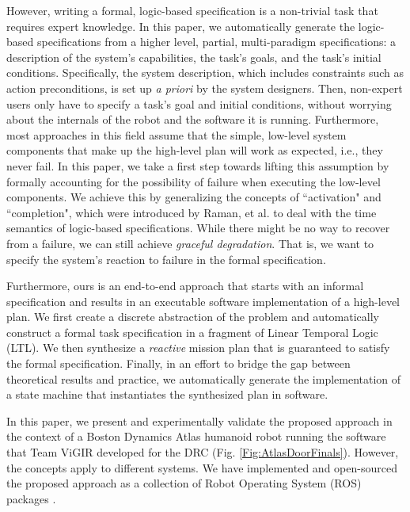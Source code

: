 However, writing a formal, logic-based specification is a non-trivial task that requires expert knowledge.
In this paper, we automatically generate the logic-based specifications from a higher level, partial, multi-paradigm specifications: a description of the system's capabilities, the task's goals, and the task's initial conditions.
Specifically, the system description, which includes constraints such as action preconditions, is set up \emph{a priori} by the system designers.
Then, non-expert users only have to specify a task's goal and initial conditions, without worrying about the internals of the robot and the software it is running.
Furthermore, most approaches in this field assume that the simple, low-level system components that make up the high-level plan will work as expected, i.e., they never fail.
In this paper, we take a first step towards lifting this assumption by formally accounting for the possibility of failure when executing the low-level components.
We achieve this by generalizing the concepts of ``activation" and ``completion", which were introduced by Raman, et al. \cite{Vasu2013ICRA} to deal with the time semantics of logic-based specifications.
While there might be no way to recover from a failure, we can still achieve \emph{graceful degradation}.
That is, we want to specify the system's reaction to failure in the formal specification.

Furthermore, ours is an end-to-end approach that starts with an informal specification and results in an executable software implementation of a high-level plan.
We first create a discrete abstraction of the problem and automatically construct a formal task specification in a fragment of Linear Temporal Logic (\textsc{LTL}).
We then synthesize a \emph{reactive} mission plan that is guaranteed to satisfy the formal specification.
Finally, in an effort to bridge the gap between theoretical results and practice, we automatically generate the implementation of a state machine that instantiates the synthesized plan in software.

In this paper, we present and experimentally validate the proposed approach in the context of a Boston Dynamics Atlas humanoid robot running the software that Team ViGIR developed for the DRC (Fig. \ref{Fig:AtlasDoorFinals}).
However, the concepts apply to different systems.
We have implemented and open-sourced the proposed approach as a collection of Robot Operating System (ROS) packages \cite{ROS2009ICRA, ROS}.


